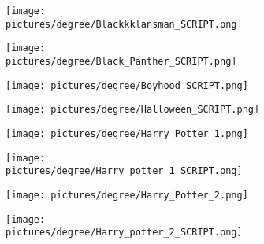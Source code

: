 \begin{figure} \ContinuedFloat
        \centering
        \begin{subfigure}{.49\textwidth}
                \centering
                \texttt{[image: pictures/degree/Blackkklansman\_SCRIPT.png]}
        \end{subfigure}
        \begin{subfigure}{.49\textwidth}
                \centering
                \texttt{[image: pictures/degree/Black\_Panther\_SCRIPT.png]}
        \end{subfigure}
\end{figure}
\begin{figure} \ContinuedFloat
        \centering
        \begin{subfigure}{.49\textwidth}
                \centering
                \texttt{[image: pictures/degree/Boyhood\_SCRIPT.png]}
        \end{subfigure}
        \begin{subfigure}{.49\textwidth}
                \centering
                \texttt{[image: pictures/degree/Halloween\_SCRIPT.png]}
        \end{subfigure}
\end{figure}
\begin{figure} \ContinuedFloat
        \centering
        \begin{subfigure}{.49\textwidth}
                \centering
                \texttt{[image: pictures/degree/Harry\_Potter\_1.png]}
        \end{subfigure}
        \begin{subfigure}{.49\textwidth}
                \centering
                \texttt{[image: pictures/degree/Harry\_potter\_1\_SCRIPT.png]}
        \end{subfigure}
\end{figure}
\begin{figure} \ContinuedFloat
        \centering
        \begin{subfigure}{.49\textwidth}
                \centering
                \texttt{[image: pictures/degree/Harry\_Potter\_2.png]}
        \end{subfigure}
        \begin{subfigure}{.49\textwidth}
                \centering
                \texttt{[image: pictures/degree/Harry\_potter\_2\_SCRIPT.png]}
        \end{subfigure}
\end{figure}
